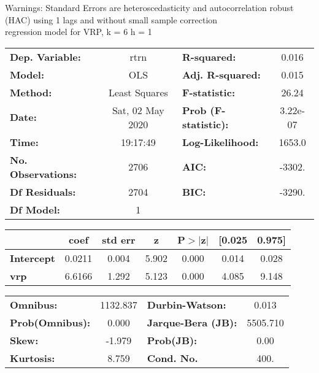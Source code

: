 Warnings: \newline
 [1] Standard Errors are heteroscedasticity and autocorrelation robust (HAC) using 1 lags and without small sample correction\\ 

regression model for VRP, k = 6 h = 1\begin{center}
\begin{tabular}{lclc}
\toprule
\textbf{Dep. Variable:}    &       rtrn       & \textbf{  R-squared:         } &     0.016   \\
\textbf{Model:}            &       OLS        & \textbf{  Adj. R-squared:    } &     0.015   \\
\textbf{Method:}           &  Least Squares   & \textbf{  F-statistic:       } &     26.24   \\
\textbf{Date:}             & Sat, 02 May 2020 & \textbf{  Prob (F-statistic):} &  3.22e-07   \\
\textbf{Time:}             &     19:17:49     & \textbf{  Log-Likelihood:    } &    1653.0   \\
\textbf{No. Observations:} &        2706      & \textbf{  AIC:               } &    -3302.   \\
\textbf{Df Residuals:}     &        2704      & \textbf{  BIC:               } &    -3290.   \\
\textbf{Df Model:}         &           1      & \textbf{                     } &             \\
\bottomrule
\end{tabular}
\begin{tabular}{lcccccc}
                   & \textbf{coef} & \textbf{std err} & \textbf{z} & \textbf{P$> |$z$|$} & \textbf{[0.025} & \textbf{0.975]}  \\
\midrule
\textbf{Intercept} &       0.0211  &        0.004     &     5.902  &         0.000        &        0.014    &        0.028     \\
\textbf{vrp}       &       6.6166  &        1.292     &     5.123  &         0.000        &        4.085    &        9.148     \\
\bottomrule
\end{tabular}
\begin{tabular}{lclc}
\textbf{Omnibus:}       & 1132.837 & \textbf{  Durbin-Watson:     } &    0.013  \\
\textbf{Prob(Omnibus):} &   0.000  & \textbf{  Jarque-Bera (JB):  } & 5505.710  \\
\textbf{Skew:}          &  -1.979  & \textbf{  Prob(JB):          } &     0.00  \\
\textbf{Kurtosis:}      &   8.759  & \textbf{  Cond. No.          } &     400.  \\
\bottomrule
\end{tabular}
\end{center}

